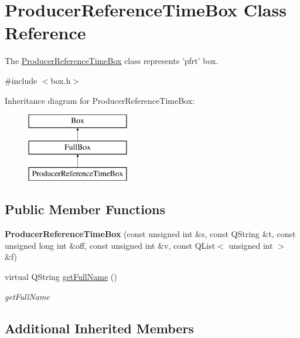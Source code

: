 \hypertarget{class_producer_reference_time_box}{\section{Producer\-Reference\-Time\-Box Class Reference}
\label{class_producer_reference_time_box}
}


The \hyperlink{class_producer_reference_time_box}{Producer\-Reference\-Time\-Box} class represents 'pfrt' box.  




{\ttfamily \#include $<$box.\-h$>$}

Inheritance diagram for Producer\-Reference\-Time\-Box\-:\begin{figure}[H]
\begin{center}
\leavevmode
\includegraphics[height=3.000000cm]{class_producer_reference_time_box}
\end{center}
\end{figure}
\subsection*{Public Member Functions}
\begin{DoxyCompactItemize}
\item 
\hypertarget{class_producer_reference_time_box_a70199982e36836260272786b3605fd83}{{\bfseries Producer\-Reference\-Time\-Box} (const unsigned int \&s, const Q\-String \&t, const unsigned long int \&off, const unsigned int \&v, const Q\-List$<$ unsigned int $>$ \&f)}\label{class_producer_reference_time_box_a70199982e36836260272786b3605fd83}

\item 
virtual Q\-String \hyperlink{class_producer_reference_time_box_a989eb0b8ec1d3edc57b251e815cc246c}{get\-Full\-Name} ()
\begin{DoxyCompactList}\small\item\em get\-Full\-Name \end{DoxyCompactList}\end{DoxyCompactItemize}
\subsection*{Additional Inherited Members}


